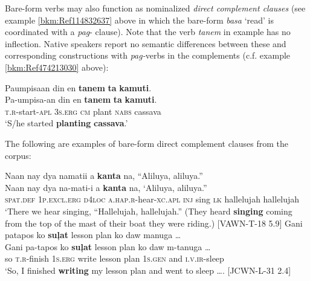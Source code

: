 Bare-form verbs may also function as nominalized \textit{direct complement clauses} (see example \ref{bkm:Ref114832637} above in which the bare-form \textit{basa} ‘read’ is coordinated with a \textit{pag}{}- clause). Note that the verb \textit{tanem} in example  has no inflection. Native speakers report no semantic differences between these and corresponding constructions with \textit{pag-}verbs in the complements (c.f. example \ref{bkm:Ref474213030} above):

\ea
\label{bkm:Ref114659732}
Paumpisaan  din  en  \textbf{tanem}  \textbf{ta}  \textbf{kamuti}. \smallskip\\
\gll Pa-umpisa-an  din  en  \textbf{tanem}  \textbf{ta}  \textbf{kamuti}. \\
\textsc{t.r}-start-\textsc{apl}  3\textsc{s.erg}  \textsc{cm}  plant  \textsc{nabs}  cassava \\
\glt ‘S/he started \textbf{planting} \textbf{cassava}.’
\z

The following are examples of bare-form direct complement clauses from the corpus:

\ea
Naan  nay  dya  namatii  a  \textbf{kanta}  na,  ``Aliluya,  aliluya.” \smallskip\\
\gll Naan  nay  dya  na-mati-i  a  \textbf{kanta}  na,  ‘Aliluya,  aliluya.” \\
\textsc{spat.def}   1\textsc{p.excl.erg}  \textsc{d}4\textsc{loc}  \textsc{a.hap.r}-hear-\textsc{xc.apl}  \textsc{inj}  sing    \textsc{lk}  hallelujah  hallelujah \\
\glt ‘There we hear singing, “Hallelujah, hallelujah.” (They heard \textbf{singing} coming from the top of the mast of their boat they were riding.) [VAWN-T-18 5.9]
\z
\ea
Gani  patapos  ko  \textbf{suļat}  lesson plan  ko  daw  manuga … \smallskip\\
\gll Gani  pa-tapos  ko  \textbf{suļat}  lesson plan  ko  daw  m-tanuga … \\
so  \textsc{t.r}-finish  1\textsc{s.erg}  write  lesson plan  1\textsc{s.gen}  and  \textsc{i.v.ir}-sleep \\
\glt ‘So, I finished \textbf{writing} my lesson plan and went to sleep …. [JCWN-L-31 2.4]
\z

